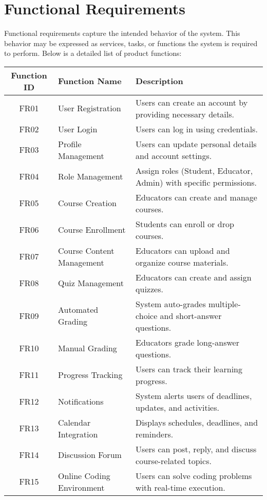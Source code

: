 \documentclass[a4paper, 11pt]{scrreprt}
\begin{document}
\section{Functional Requirements}

Functional requirements capture the intended behavior of the system. This behavior may be expressed as services, tasks, or functions the system is required to perform. Below is a detailed list of product functions:

\begin{table}[h!]
    \centering
    \begin{tabular}{|c|l|p{10cm}|}
    \hline
    \textbf{Function ID} & \textbf{Function Name} & \textbf{Description} \\
    \hline
    FR01 & User Registration & Users can create an account by providing necessary details. \\
    FR02 & User Login & Users can log in using credentials. \\
    FR03 & Profile Management & Users can update personal details and account settings. \\
    FR04 & Role Management & Assign roles (Student, Educator, Admin) with specific permissions. \\
    FR05 & Course Creation & Educators can create and manage courses. \\
    FR06 & Course Enrollment & Students can enroll or drop courses. \\
    FR07 & Course Content Management & Educators can upload and organize course materials. \\
    FR08 & Quiz Management & Educators can create and assign quizzes. \\
    FR09 & Automated Grading & System auto-grades multiple-choice and short-answer questions. \\
    FR10 & Manual Grading & Educators grade long-answer questions. \\
    FR11 & Progress Tracking & Users can track their learning progress. \\
    FR12 & Notifications & System alerts users of deadlines, updates, and activities. \\
    FR13 & Calendar Integration & Displays schedules, deadlines, and reminders. \\
    FR14 & Discussion Forum & Users can post, reply, and discuss course-related topics. \\
    FR15 & Online Coding Environment & Users can solve coding problems with real-time execution. \\

\end{tabular}
\end{table}
\end{document}
